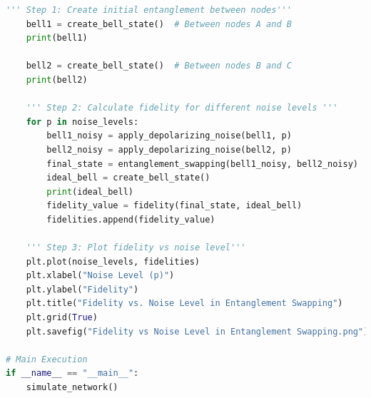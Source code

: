 \documentclass[12pt,a4paper] {report}
\begin{document}
\begin{lstlisting}[language=Python, caption=Entanglement swapping(fidelity vs polarizing noise), label=code:QKD]
    ''' Step 1: Create initial entanglement between nodes'''
    bell1 = create_bell_state()  # Between nodes A and B
    print(bell1)

    bell2 = create_bell_state()  # Between nodes B and C
    print(bell2)
    
    ''' Step 2: Calculate fidelity for different noise levels '''
    for p in noise_levels:
        bell1_noisy = apply_depolarizing_noise(bell1, p)
        bell2_noisy = apply_depolarizing_noise(bell2, p)
        final_state = entanglement_swapping(bell1_noisy, bell2_noisy)
        ideal_bell = create_bell_state()
        print(ideal_bell)
        fidelity_value = fidelity(final_state, ideal_bell)
        fidelities.append(fidelity_value)
    
    ''' Step 3: Plot fidelity vs noise level'''
    plt.plot(noise_levels, fidelities)
    plt.xlabel("Noise Level (p)")
    plt.ylabel("Fidelity")
    plt.title("Fidelity vs. Noise Level in Entanglement Swapping")
    plt.grid(True)
    plt.savefig("Fidelity vs Noise Level in Entanglement Swapping.png")   

# Main Execution
if __name__ == "__main__":
    simulate_network()


\end{lstlisting}
\end{document}

